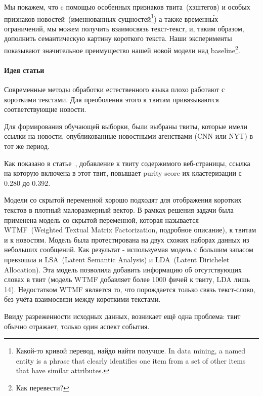             Мы покажем, что c помощью особенных признаков твита~(хэштегов) и особых признаков новостей~(именнованных сущностей\footnote{Какой-то кривой перевод, найдо найти получше. In data mining, a named entity is a phrase that clearly identifies one item from a set of other items that have similar attributes.}) а также временн\'{ы}х ограничений, мы можем получить взаимосвязь текст-текст, и, таким образом, дополнить семантическую картину короткого текста.
            Наши эксперименты показывают значительное преимущество нашей новой модели над baseline\footnote{Как перевести?}.

        \paragraph{Идея статьи}
            Современные методы обработки естественного языка плохо работают с короткими текстами. Для преоболения этого к твитам привязываются соответствующие новости.

            Для формирования обучающей выборки, были выбраны твиты, которые имели ссылки на новости, опубликованные новостными агенствами (CNN или NYT) в тот же период.

            Как показано в статье~\cite{long_to_short}, добавление к твиту содержимого веб-страницы, ссылка на которую включена в этот твит, повышает {\color{red} purity score} их кластеризации с 0.280 до 0.392.

            Модели со скрытой переменной хорошо подходят для отображения коротких текстов в плотный малоразмерный вектор.
            В рамках решения задачи была применена модель со скрытой переменной, которая называется WTMF~(Weighted Textual Matrix Factorization, подробное описание\cite{wtmf}), к твитам и к новостям. Модель была протестирована на двух схожих наборах данных из небольших сообщений. Как результат - используемая модель с большим запасом превзошла и LSA~(Latent Semantic Analysis) и LDA~(Latent Dirichelet Allocation). Эта модель позволила добавить информацию об отсутствующих словах в твит (модель WTMF добавляет более 1000 фичей к твиту, LDA лишь 14). Недостатком WTMF является то, что порождается только связь текст-слово, без учёта взаимосвязи между короткими текстами.

            Ввиду разреженности исходных данных, возникает ещё одна проблема: твит обычно отражает, только один аспект события.

